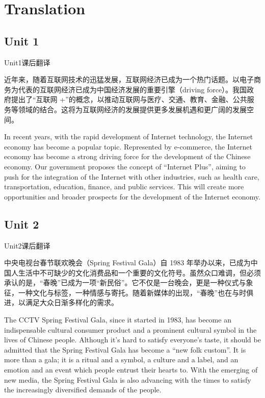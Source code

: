 \section{Translation}
\subsection{Unit 1}

\begin{question}{Unit1课后翻译}
	
近年来，随着互联网技术的迅猛发展，互联网经济已成为一个热门话题。以电子商务为代表的互联网经济已成为中国经济发展的重要引擎（driving force）。我国政府提出了“互联网 +”的概念，以推动互联网与医疗、交通、教育、金融、公共服务等领域的结合。这将为互联网经济的发展提供更多发展机遇和更广阔的发展空间。

\end{question}

\begin{solution}

In recent years, with the rapid development of Internet technology, the Internet economy has become a popular topic. Represented by e-commerce, the Internet economy has become a strong driving force for the development of the Chinese economy. Our government proposes the concept of “Internet Plus”, aiming to push for the integration of the Internet with other industries, such as health care, transportation, education, finance, and public services. This will create more opportunities and broader prospects for the development of the Internet economy.

\end{solution}


\subsection{Unit 2}

\begin{question}{Unit2课后翻译}

中央电视台春节联欢晚会（Spring Festival Gala）自 1983 年举办以来，已成为中国人生活中不可缺少的文化消费品和一个重要的文化符号。虽然众口难调，但必须承认的是，“春晚”已成为一项“新民俗”。它不仅是一台晚会，更是一种仪式与象征，一种文化与标签，一种情感与寄托。随着新媒体的出现，“春晚”也在与时俱进，以满足大众日渐多样化的需求。

\end{question}

\begin{solution}
	
The CCTV Spring Festival Gala, since it started in 1983, has become an indispensable cultural consumer product and a prominent cultural symbol in the lives of Chinese people. Although it’s hard to satisfy everyone’s taste, it should be admitted that the Spring Festival Gala has become a “new folk custom”. It is more than a gala; it is a ritual and a symbol, a culture and a label, and an emotion and an event which people entrust their hearts to. With the emerging of new media, the Spring Festival Gala is also advancing with the times to satisfy the increasingly diversified demands of the people.

\end{solution}


